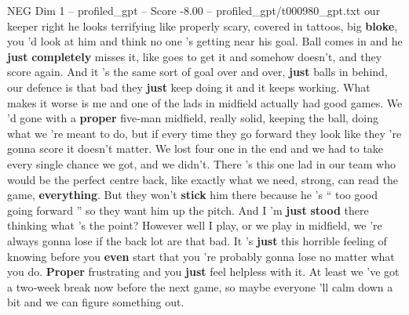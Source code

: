\begin{textsample}{NEG Dim 1 – profiled\_gpt – Score -8.00 – profiled\_gpt/t000980\_gpt.txt}  \label{ex:f1_neg_006}
our keeper right he looks terrifying like properly scary, covered in tattoos, big \textbf{bloke}, you ’d look at him and think no one ’s getting near his goal.
Ball comes in and he \textbf{just} \textbf{completely} misses it, like goes to get it and somehow doesn't, and they score again.
And it ’s the same sort of goal over and over, \textbf{just} balls in behind, our defence is that bad they \textbf{just} keep doing it and it keeps working.
What makes it worse is me and one of the lads in midfield actually had good games.
We ’d gone with a \textbf{proper} five‑man midfield, really solid, keeping the ball, doing what we ’re meant to do, but if every time they go forward they look like they ’re gonna score it doesn't matter.
We lost four one in the end and we had to take every single chance we got, and we didn't.
There ’s this one lad in our team who would be the perfect centre back, like exactly what we need, strong, can read the game, \textbf{everything}.
But they won't \textbf{stick} him there because he ’s “ too good going forward ” so they want him up the pitch.
And I ’m \textbf{just} \textbf{stood} there thinking what ’s the point?
However well I play, or we play in midfield, we ’re always gonna lose if the back lot are that bad.
It ’s \textbf{just} this horrible feeling of knowing before you \textbf{even} start that you ’re probably gonna lose no matter what you do. \textbf{Proper} frustrating and you \textbf{just} feel helpless with it.
At least we ’ve got a two‑week break now before the next game, so maybe everyone ’ll calm down a bit and we can figure something out.

\end{textsample}
